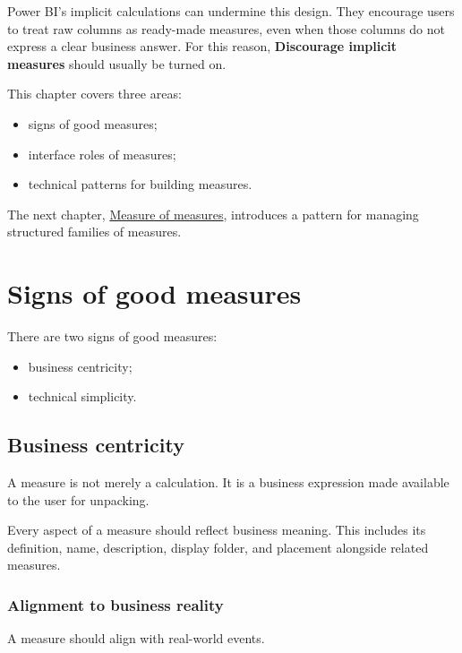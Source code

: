 \documentclass[10pt,openany,10pt]{book}
\providecommand{\tightlist}{%
  \setlength{\itemsep}{0pt}\setlength{\parskip}{0pt}}
\begin{document}
Power BI's implicit calculations can undermine this design. They
encourage users to treat raw columns as ready-made measures, even when
those columns do not express a clear business answer. For this reason,
\textbf{Discourage implicit measures} should usually be turned on.

This chapter covers three areas:

\begin{itemize}
\tightlist
\item
  signs of good measures;
\item
  interface roles of measures;
\item
  technical patterns for building measures.
\end{itemize}

The next chapter,
\hyperref[docs-presenting-insights-measure-of-measures]{Measure of
measures}, introduces a pattern for managing structured families of
measures.

\section{Signs of good measures}\label{signs-of-good-measures}

There are two signs of good measures:

\begin{itemize}
\tightlist
\item
  business centricity;
\item
  technical simplicity.
\end{itemize}

\subsection{Business centricity}\label{business-centricity}

A measure is not merely a calculation. It is a business expression made
available to the user for unpacking.

Every aspect of a measure should reflect business meaning. This includes
its definition, name, description, display folder, and placement
alongside related measures.

\subsubsection{Alignment to business
reality}\label{alignment-to-business-reality}

A measure should align with real-world events.
\end{document}
